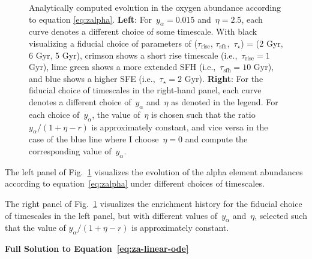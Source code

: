 \documentclass[12pt]{article}
\newcommand{\timescale}[1]{\ensuremath{\tau_\text{#1}}}
\begin{document}
\begin{figure}
{Analytically computed evolution in the oxygen abundance according to equation
\ref{eq:zalpha}.
\textbf{Left}: For~$y_\alpha = 0.015$ and~$\eta = 2.5$, each curve denotes a
different choice of some timescale.
With black visualizing a fiducial choice of parameters of (\timescale{rise},
\timescale{sfh},~$\tau_\star$) = (2 Gyr, 6 Gyr, 5 Gyr), crimson shows a short
rise timescale (i.e.,~$\timescale{rise} = 1$ Gyr), lime green shows a more
extended SFH (i.e.,~$\timescale{sfh} = 10$ Gyr), and blue shows a higher SFE
(i.e.,~$\tau_\star = 2$ Gyr).
\textbf{Right}: For the fiducial choice of timescales in the right-hand panel,
each curve denotes a different choice of~$y_\alpha$ and~$\eta$ as denoted in
the legend.
For each choice of~$y_\alpha$, the value of~$\eta$ is chosen such that the
ratio~$y_\alpha / (1 + \eta - r)$ is approximately constant, and vice versa in
the case of the blue line where I choose~$\eta = 0$ and compute the
corresponding value of~$y_\alpha$.
}
\label{fig:analytic-evolution}
\end{figure}

The left panel of Fig.~\ref{fig:analytic-evolution} visualizes the evolution of
the alpha element abundances according to equation~\ref{eq:zalpha} under
different choices of timescales.
\par
The right panel of Fig.~\ref{fig:analytic-evolution} visualizes the enrichment
history for the fiducial choice of timescales in the left panel, but with
different values of~$y_\alpha$ and~$\eta$, selected such that the value of
$y_\alpha / (1 + \eta - r)$ is approximately constant.

\newpage



\newpage
\noindent
\textbf{Full Solution to Equation~\ref{eq:za-linear-ode}}
\end{document}

